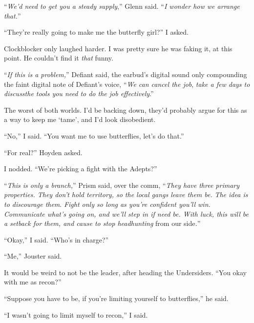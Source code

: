 ``\emph{We'd need to get you a steady supply},'' Glenn said.  ``\emph{I wonder how we arrange that.}''



``They're really going to make me the butterfly girl?'' I asked.



Clockblocker only laughed harder.  I was pretty sure he was faking it, at this point.  He couldn't find it \emph{that} funny.



``\emph{If this is a problem,}'' Defiant said, the earbud's digital sound only compounding the faint digital note of Defiant's voice, ``\emph{We can cancel the job}, \emph{take a few days to discuss}\emph{the tools you need to do the job effectively}.''



The worst of both worlds.  I'd be backing down, they'd probably argue for this as a way to keep me `tame', and I'd look disobedient.



``No,'' I said.  ``You want me to use butterflies, let's do that.''



``For real?'' Hoyden asked.



I nodded.  ``We're picking a fight with the Adepts?''



``\emph{This is only a branch,}'' Prism said, over the comm, ``\emph{They have three primary properties.  They don't hold territory, so the local gangs leave them be.  }\emph{The idea is to discourage them}.  \emph{Fight only so long as you're confident you'll win.  Communicate what's going on, and we'll step in if need be.  With luck, this will be a setback for them, and cause to stop headhunting }from our side\emph{.}''



``Okay,'' I said.  ``Who's in charge?''



``Me,'' Jouster said.



It would be weird to not be the leader, after heading the Undersiders.  ``You okay with me as recon?''



``Suppose you have to be, if you're limiting yourself to butterflies,'' he said.



``I wasn't going to limit myself to recon,'' I said.



